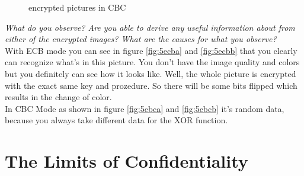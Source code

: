 \begin{figure}[htp]
    \centering
    \caption{encrypted pictures in CBC}
\end{figure}

\textit{What do you observe? Are you able to derive any useful information about from either of the encrypted images? What are the causes for what you observe?}\\
With ECB mode you can see in figure \ref{fig:5ecba} and \ref{fig:5ecbb} that you clearly can recognize what's in this picture. You don't have the image quality and colors but you definitely can see how it looks like. Well, the whole picture is encrypted with the exact same key and prozedure. So there will be some bits flipped which results in the change of color.\\
In CBC Mode as shown in figure \ref{fig:5cbca} and \ref{fig:5cbcb} it's random data, because you always take different data for the XOR function.

\section{The Limits of Confidentiality}



